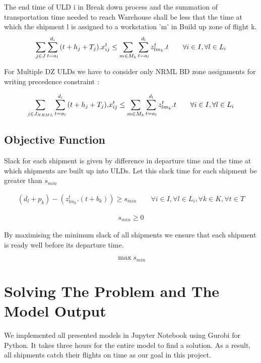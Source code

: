 \documentclass[11pt,a4paper,fleqn]{article}
\begin{document}
The end time of ULD i in Break down process and the summation of transportation time needed to reach Warehouse shall be less that the time at which the shipment l is assigned to a workstation 'm' in Build up zone of flight k.
\begin{align}
 \sum_{j \in J}\sum_{t=a_{l}}^{d_{i}}{\color{black}{(t + h_{j} + T_{j})}} . x_{ij}^t  \le \sum_{m \in M_{k}}\sum_{t=a_{l}}^{d_{l}}z_{lm_{k}}^t . t \qquad \forall i \in I , \forall l \in L_{i}
\end{align}

For Multiple DZ ULDs we have to consider only NRML BD zone assignments for writing precedence constraint : 

\begin{align}
 \sum_{j \in J_{NRML}}\sum_{t=a_{l}}^{d_{i}}{\color{black}{(t + h_{j} + T_{j})}} . x_{ij}^t  \le \sum_{m \in M_{k}}\sum_{t=a_{l}}^{d_{l}}z_{lm_{k}}^t . t \qquad \forall i \in I , \forall l \in L_{i}
\end{align}


\subsection{Objective Function}
\label{sec:objBUZone}

Slack for each shipment is given by difference in departure time and the time at which shipments are built up into ULDs. Let this slack time for each shipment be greater than ${s_{min}}$

\begin{align}
 ( d_{l} + p_{k}) - (z_{lm_{k}}^t .(t + b_{k}) )  \ge s_{min} \qquad \forall i \in I, \forall l \in L_{i}, \forall k \in K, \forall t \in T
\end{align}

\begin{align}
s_{min} \ge 0
\end{align}

By maximising the minimum slack of all shipments we ensure that each shipment is ready well before its departure time.

\begin{equation*}
\max s_{min}
\end{equation*}


\section{Solving The Problem and The Model Output}
\label{sec:modeloutput}

We implemented all presented models in Jupyter Notebook using Gurobi for Python. It takes three hours for the entire model to find a solution. As a result, all shipments catch their flights on time as our goal in this project. 
\end{document}
